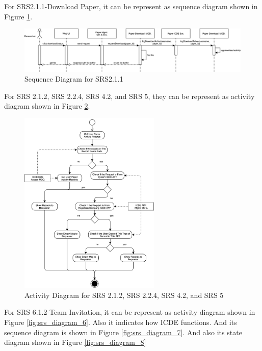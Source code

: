 For SRS2.1.1-Download Paper, it can be represent as sequence diagram shown in Figure \ref{fig:srs_diagram_4}.

\begin{figure}[t]
	\centering
	\includegraphics[width=1\textwidth]{./img/srs_diagram_4.png}
	\caption{Sequence Diagram for SRS2.1.1}

	\label{fig:srs_diagram_4}
\end{figure}


For SRS 2.1.2, SRS 2.2.4, SRS 4.2, and SRS 5, they can be represent as activity diagram shown in Figure \ref{fig:srs_diagram_5}.

\begin{figure}[t]
	\centering
	\includegraphics[width=0.6\textwidth]{./img/srs_diagram_5.png}
	\caption{Activity Diagram for SRS 2.1.2, SRS 2.2.4, SRS 4.2, and SRS 5}

	\label{fig:srs_diagram_5}
\end{figure}

For SRS 6.1.2-Team Invitation, it can be represent as activity diagram shown in Figure \ref{fig:srs_diagram_6}.
Also it indicates how ICDE functions. And its sequence diagram is shown in Figure \ref{fig:srs_diagram_7}.
And also its state diagram shown in Figure \ref{fig:srs_diagram_8}


